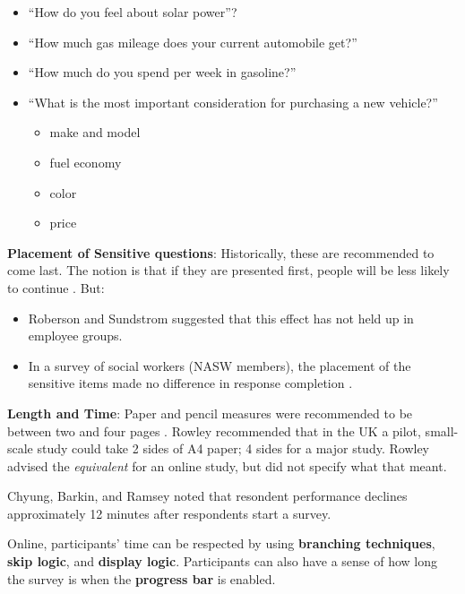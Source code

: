 \documentclass[
  english,
]{book}
\providecommand{\tightlist}{%
  \setlength{\itemsep}{0pt}\setlength{\parskip}{0pt}}
\begin{document}
\begin{itemize}
\tightlist
\item
  ``How do you feel about solar power''?
\item
  ``How much gas mileage does your current automobile get?''
\item
  ``How much do you spend per week in gasoline?''
\item
  ``What is the most important consideration for purchasing a new vehicle?''

  \begin{itemize}
  \tightlist
  \item
    make and model
  \item
    fuel economy
  \item
    color
  \item
    price
  \end{itemize}
\end{itemize}

\textbf{Placement of Sensitive questions}: Historically, these are recommended to come last. The notion is that if they are presented first, people will be less likely to continue \citep{krathwohl_methods_2009, rowley_designing_2014}. But:

\begin{itemize}
\tightlist
\item
  Roberson and Sundstrom \citeyearpar{roberson_questionnaire_1990} suggested that this effect has not held up in employee groups.
\item
  In a survey of social workers (NASW members), the placement of the sensitive items made no difference in response completion \citep{robert_g._green_should_2000}.
\end{itemize}

\textbf{Length and Time}: Paper and pencil measures were recommended to be between two and four pages \citep{krathwohl_methods_2009}. Rowley \citeyearpar{rowley_designing_2014}recommended that in the UK a pilot, small-scale study could take 2 sides of A4 paper; 4 sides for a major study. Rowley advised the \emph{equivalent} for an online study, but did not specify what that meant.

Chyung, Barkin, and Ramsey \citeyearpar{chyung_evidencebased_2018} noted that resondent performance declines approximately 12 minutes after respondents start a survey.

Online, participants' time can be respected by using \textbf{branching techniques}, \textbf{skip logic}, and \textbf{display logic}. Participants can also have a sense of how long the survey is when the \textbf{progress bar} is enabled.
\end{document}
